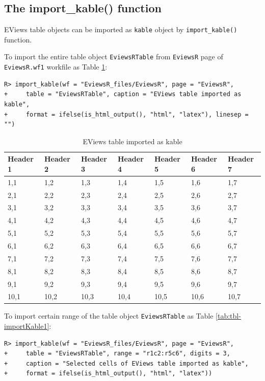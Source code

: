 \hypertarget{sec-importtable}{%
\subsection{The import\_kable() function}\label{sec-importtable}}

EViews table objects can be imported as \texttt{kable} object by \texttt{import\_kable()} function.

To import the entire table object \texttt{EviewsRTable} from \texttt{EviewsR} page of \texttt{EviewsR.wf1} workfile as Table \ref{tab:tbl-importKable}:

\begin{verbatim}
R> import_kable(wf = "EviewsR_files/EviewsR", page = "EviewsR",
+     table = "EviewsRTable", caption = "EViews table imported as kable",
+     format = ifelse(is_html_output(), "html", "latex"), linesep = "")
\end{verbatim}

\begin{table}

\caption{\label{tab:tbl-importKable}EViews table imported as kable}
\centering
\begin{tabular}[t]{l|l|l|l|l|l|l}
\hline
Header 1 & Header 2 & Header 3 & Header 4 & Header 5 & Header 6 & Header 7\\
\hline
1,1 & 1,2 & 1,3 & 1,4 & 1,5 & 1,6 & 1,7\\
2,1 & 2,2 & 2,3 & 2,4 & 2,5 & 2,6 & 2,7\\
3,1 & 3,2 & 3,3 & 3,4 & 3,5 & 3,6 & 3,7\\
4,1 & 4,2 & 4,3 & 4,4 & 4,5 & 4,6 & 4,7\\
5,1 & 5,2 & 5,3 & 5,4 & 5,5 & 5,6 & 5,7\\
6,1 & 6,2 & 6,3 & 6,4 & 6,5 & 6,6 & 6,7\\
7,1 & 7,2 & 7,3 & 7,4 & 7,5 & 7,6 & 7,7\\
8,1 & 8,2 & 8,3 & 8,4 & 8,5 & 8,6 & 8,7\\
9,1 & 9,2 & 9,3 & 9,4 & 9,5 & 9,6 & 9,7\\
10,1 & 10,2 & 10,3 & 10,4 & 10,5 & 10,6 & 10,7\\
\hline
\end{tabular}
\end{table}

To import certain range of the table object \texttt{EviewsRTable} as Table \ref{tab:tbl-importKable1}:

\begin{verbatim}
R> import_kable(wf = "EviewsR_files/EviewsR", page = "EviewsR",
+     table = "EviewsRTable", range = "r1c2:r5c6", digits = 3,
+     caption = "Selected cells of EViews table imported as kable",
+     format = ifelse(is_html_output(), "html", "latex"))
\end{verbatim}

